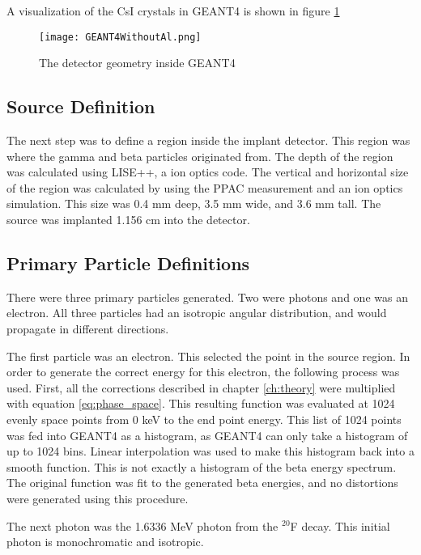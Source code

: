 \documentclass[main.tex]{subfiles}
\begin{document}
A visualization of the CsI crystals in GEANT4 is shown in figure \ref{fig:GEANT4Det}

\begin{figure}[!htb]
	\centerline{\texttt{[image: GEANT4WithoutAl.png]}}
	\caption{The detector geometry inside GEANT4}
	\label{fig:GEANT4Det}
\end{figure}

\subsection{Source Definition}
The next step was to define a region inside the implant detector.
This region was where the gamma and beta particles originated from.
The depth of the region was calculated using LISE++, a ion optics code.
The vertical and horizontal size of the region was calculated by using the PPAC measurement and an ion optics simulation.
This size was 0.4 mm deep, 3.5 mm wide, and 3.6 mm tall.
The source was implanted 1.156 cm into the detector.

\subsection{Primary Particle Definitions}
There were three primary particles generated.
Two were photons and one was an electron.
All three particles had an isotropic angular distribution, and would propagate in different directions.

The first particle was an electron. 
This selected the point in the source region.
In order to generate the correct energy for this electron, the following process was used.
First, all the corrections described in chapter \ref{ch:theory} were multiplied with equation \ref{eq:phase_space}.
This resulting function was evaluated at 1024 evenly space points from 0 keV to the end point energy.
This list of 1024 points was fed into GEANT4 as a histogram, as GEANT4 can only take a histogram of up to 1024 bins. 
Linear interpolation was used to make this histogram back into a smooth function.
This is not exactly a histogram of the beta energy spectrum.
The original function was fit to the generated beta energies, and no distortions were generated using this procedure.

The next photon was the 1.6336 MeV photon from the $^{20}$F decay.
This initial photon is monochromatic and isotropic.
\end{document}
